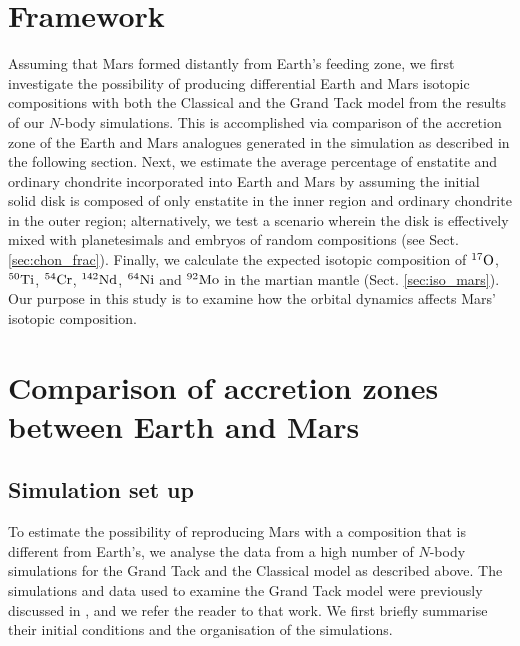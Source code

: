 \documentclass{aa}
\begin{document}
\section{Framework}
\label{subsec:frame}
Assuming that Mars formed distantly from Earth’s feeding zone, we first investigate the possibility of producing differential Earth and Mars isotopic compositions with both the Classical and the Grand Tack model from the results of our $N$-body simulations. This is accomplished via comparison of the accretion zone of the Earth and Mars analogues generated in the simulation as described in the following section. Next, we estimate the average percentage of enstatite and ordinary chondrite incorporated into Earth and Mars by assuming the initial solid disk is composed of only enstatite in the inner region and ordinary chondrite in the outer region; alternatively, we test a scenario wherein the disk is effectively mixed with planetesimals and embryos of random compositions (see Sect. \ref{sec:chon_frac}). Finally, we calculate the expected isotopic composition of $^{17} \rm O$, $^{50} \rm Ti$, $^{54} \rm Cr$, $^{142} \rm Nd$, $^{64} \rm Ni$ and $^{92} \rm Mo$ in the martian mantle (Sect. \ref{sec:iso_mars}). Our purpose in this study is to examine how the orbital dynamics affects Mars' isotopic composition.

\section{Comparison of accretion zones between Earth and Mars}
\label{sec:accret_com}
\subsection{Simulation set up}
\label{subsec:simulation}

To estimate the possibility of reproducing Mars with a composition that is different from Earth’s, we analyse the data from a high number of $N$-body simulations for the Grand Tack and the Classical model as described above. The simulations and data used to examine the Grand Tack model were previously discussed in \cite{brasser2016analysis}, and we refer the reader to that work. We first briefly summarise their initial conditions and the organisation of the simulations.
\end{document}
